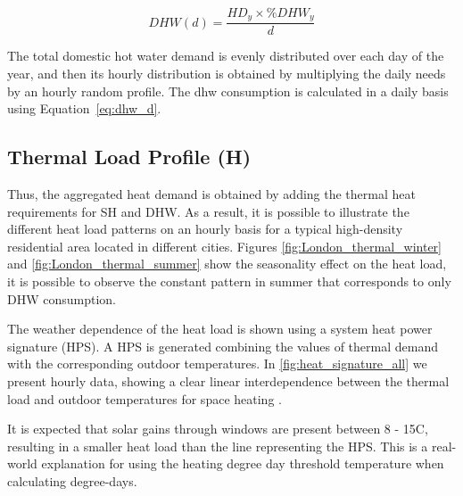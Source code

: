 \documentclass{article}
\begin{document}
\begin{equation}
\label{eq:dhw_d}
DHW(d) = \frac{HD_{y} \times \%DHW_{y}}{d}    
\end{equation}

The total domestic hot water demand is evenly distributed over each day of the year, and then its hourly distribution is obtained by multiplying the daily needs by an hourly random profile. The \gls{dhw} consumption is calculated in a daily basis using Equation~\ref{eq:dhw_d}. 

\subsection{Thermal Load Profile (H)}

Thus, the aggregated heat demand is obtained by adding the thermal heat requirements for SH and DHW. As a result, it is possible to illustrate the different heat load patterns on an hourly basis for a typical high-density residential area located in different cities. Figures \ref{fig:London_thermal_winter} and \ref{fig:London_thermal_summer} show the seasonality effect on the heat load, it is possible to observe the constant pattern in summer that corresponds to only DHW consumption.


The weather dependence of the heat load is shown using a system heat power signature (HPS). A HPS is generated combining the values of thermal demand with the corresponding outdoor temperatures. In \ref{fig:heat_signature_all} we present hourly data, showing a clear linear interdependence between the thermal load and outdoor temperatures for space heating \cite{werner_district_2013}.


It is expected that solar gains through windows are present between 8 - 15\degree C, resulting in a smaller heat load than the line representing the HPS. This is a real-world explanation for using the heating degree day threshold temperature when calculating degree-days.
\end{document}

